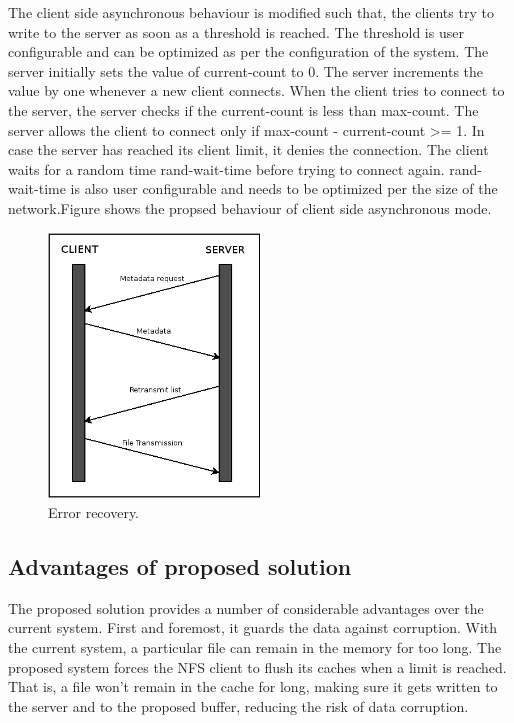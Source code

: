 \documentclass[conference]{IEEEtran}
\begin{document}
The client side asynchronous behaviour is modified such that, the clients 
try to write to the server as soon as a threshold is reached. The threshold
is user configurable and can be optimized as per the configuration of the
system. The server initially sets the value of current-count to 0. The 
server increments the value by one whenever a new client connects. When the
client tries to connect to the server, the server checks if the
current-count is less than max-count. The server allows the client to
connect only if max-count - current-count >= 1. In case the server has
reached its client limit, it denies the connection. The client waits for a
random time rand-wait-time before trying to connect again. rand-wait-time
is also user configurable and needs to be optimized per the size of the
network.Figure shows the propsed behaviour of client side asynchronous mode.
\begin{figure}[htbp]
\centerline{\includegraphics[width=0.5\textwidth,natwidth=400,natheight=100]{error_recovery.png}}
\caption{Error recovery.}
\label{fig}
\end{figure}

\subsection{Advantages of proposed solution}
The proposed solution provides a number of considerable advantages over the
current system. First and foremost, it guards the data against corruption.
With the current system, a particular file can remain in the memory for too
long. The proposed system forces the NFS client to flush its caches when a
limit is reached. That is, a file won't remain in the cache for long, making
sure it gets written to the server and to the proposed buffer, reducing the
risk of data corruption.
\end{document}
